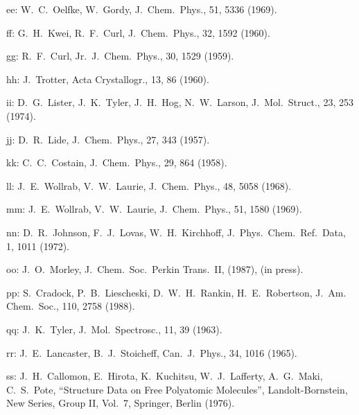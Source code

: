 \begin{description}
\item{  ee: } W.\ C.\ Oelfke, W.\ Gordy, J.\ Chem.\ Phys., 51, 5336 (1969).
  
\item{  ff: } G.\ H.\ Kwei, R.\ F.\ Curl, J.\ Chem.\ Phys., 32, 1592 (1960).
  
\item{  gg: } R.\ F.\ Curl, Jr.\ J.\ Chem.\ Phys., 30, 1529 (1959).
  
\item{  hh: } J.\ Trotter, Acta Crystallogr., 13, 86 (1960).
  
\item{  ii: } D.\ G.\ Lister, J.\ K.\ Tyler, J.\ H.\ Hog, N.\ W.\ Larson, J.\ Mol.\ Struct., 23,
       253 (1974).
  
\item{  jj: } D.\ R.\ Lide, J.\ Chem.\ Phys., 27, 343 (1957).
  
\item{  kk: } C.\ C.\ Costain, J.\ Chem.\ Phys., 29, 864 (1958).
  
\item{  ll: } J.\ E.\ Wollrab, V.\ W.\ Laurie, J.\ Chem.\ Phys., 48, 5058 (1968).
  
\item{  mm: } J.\ E.\ Wollrab, V.\ W.\ Laurie, J.\ Chem.\ Phys., 51, 1580 (1969).
  
\item{  nn: } D.\ R.\ Johnson, F.\ J.\ Lovas, W.\ H.\ Kirchhoff, J.\ Phys.\ Chem.\ Ref.\ Data,
       1, 1011 (1972).
  
\item{  oo: } J.\ O.\ Morley, J.\ Chem.\ Soc.\ Perkin Trans.\ II, (1987), (in press).
  
\item{  pp: } S.\ Cradock, P.\ B.\ Liescheski, D.\ W.\ H.\ Rankin, H.\ E.\ Robertson, J.\ Am.
       Chem.\ Soc., 110, 2758 (1988).
  
\item{  qq: } J.\ K.\ Tyler, J.\ Mol.\ Spectrosc., 11, 39 (1963).
  
\item{  rr: } J.\ E.\ Lancaster, B.\ J.\ Stoicheff, Can.\ J.\ Phys., 34, 1016 (1965).
  
\item{  ss: } J.\ H.\ Callomon, E.\ Hirota, K.\ Kuchitsu, W.\ J.\ Lafferty, A.\ G.\ Maki,
       C.\ S.\ Pote, ``Structure Data on Free Polyatomic Molecules'',
       Landolt-Bornstein, New Series, Group II, Vol.\ 7, Springer, Berlin (1976).
  

\end{description}
